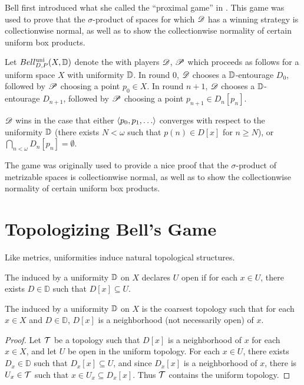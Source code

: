 Bell first introduced what she called the ``proximal game'' in \cite{MR3239205}.
This game was used to prove that the
$\sigma$-product of spaces for which $\mathscr{D}$ has a winning strategy is
collectionwise normal, as well as to show the collectionwise normality
of certain uniform box products.

\begin{game}
  Let $Bell_{D,P}^{\textrm{uni}}(X, \mathbb{D})$ denote the 
  with players $\mathscr{D}$, $\mathscr{P}$ which
  proceeds as follows for a uniform space $X$ with uniformity $\mathbb{D}$. In round
  $0$, $\mathscr{D}$ chooses a $\mathbb{D}$-entourage $D_0$, followed by $\mathscr{P}$ choosing a
  point $p_0\in X$. In round $n+1$, $\mathscr{D}$ chooses a $\mathbb{D}$-entourage
  $D_{n+1}$, followed by $\mathscr{P}$ choosing a point $p_{n+1}\in D_n[p_n]$.

  $\mathscr{D}$ wins in the case that either $\<p_0,p_1,\dots\>$ converges
  with respect to the uniformity $\mathbb{D}$ (there exists $N<\omega$ such that
  $p(n)\in D[x]$ for $n\geq N$), or $\bigcap_{n<\omega}D_n[p_n] = \emptyset$.
\end{game}

The game was originally used to provide a nice proof that the
$\sigma$-product of metrizable spaces is collectionwise normal, as well as to
show the collectionwise normality of certain uniform box products.

\section{Topologizing Bell's Game}

Like metrics, uniformities induce natural topological structures.

\begin{defn}
  The  induced by a uniformity $\mathbb{D}$ on $X$
  declares $U$ open if for each $x\in U$, there exists $D\in\mathbb{D}$
  such that $D[x]\subseteq U$.
\end{defn}

\begin{thm}
  The  induced by a uniformity $\mathbb{D}$ on $X$ is the
  coarsest topology such that for each $x\in X$ and $D\in\mathbb{D}$,
  $D[x]$ is a neighborhood (not necessarily open) of $x$.
\end{thm}

\begin{proof}
  Let $\mathcal{T}$ be a topology such that $D[x]$ is a neighborhood
  of $x$ for each $x\in X$, and let $U$ be open in the uniform topology.
  For each $x\in U$, there exists $D_x\in\mathbb{D}$ such that
  $D_x[x]\subseteq U$, and since $D_x[x]$ is a neighborhood of $x$, there
  is $U_x\in \mathcal{T}$ such that $x\in U_x\subseteq D_x[x]$. Thus
  $\mathcal{T}$ contains the uniform topology.
\end{proof}

